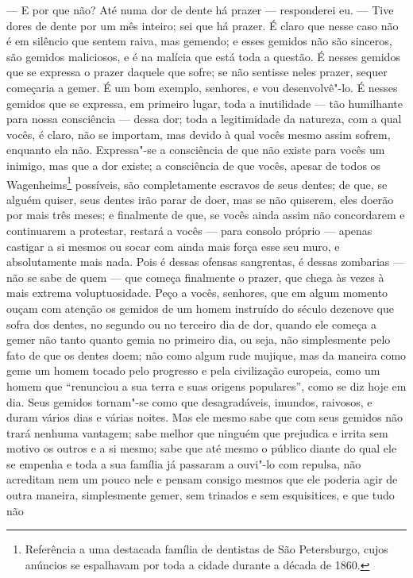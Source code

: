 --- E por que não? Até numa dor de dente há prazer --- responderei eu. ---
Tive dores de dente por um mês inteiro; sei que há prazer. É claro que
nesse caso não é em silêncio que sentem raiva, mas gemendo; e esses
gemidos não são sinceros, são gemidos maliciosos, e é na malícia que
está toda a questão. É nesses gemidos que se expressa o prazer daquele
que sofre; se não sentisse neles prazer, sequer começaria a gemer. É um
bom exemplo, senhores, e vou desenvolvê"-lo. É nesses gemidos que se
expressa, em primeiro lugar, toda a inutilidade --- tão humilhante para
nossa consciência --- dessa dor; toda a legitimidade da natureza, com a
qual vocês, é claro, não se importam, mas devido à qual vocês mesmo
assim sofrem, enquanto ela não. Expressa"-se a consciência de que não
existe para vocês um inimigo, mas que a dor existe; a consciência de
que vocês, apesar de todos os Wagenheims\footnote{ Referência a uma destacada 
família de dentistas de São Petersburgo,
cujos anúncios se espalhavam por toda a cidade durante a década de
1860.} possíveis, são completamente escravos de seus dentes; de que, se alguém
quiser, seus dentes irão parar de doer, mas se não quiserem, eles
doerão por mais três meses; e finalmente de que, se vocês ainda assim
não concordarem e continuarem a protestar, restará a vocês --- para
consolo próprio --- apenas castigar a si mesmos ou socar com ainda mais
força esse seu muro, e absolutamente mais nada. Pois é dessas ofensas
sangrentas, é dessas zombarias --- não se sabe de quem --- que começa
finalmente o prazer, que chega às vezes à mais extrema voluptuosidade.
Peço a vocês, senhores, que em algum momento ouçam com atenção os
gemidos de um homem instruído do século  dezenove que sofra dos dentes, no
segundo ou no terceiro dia de dor, quando ele começa a gemer não tanto
quanto gemia no primeiro dia, ou seja, não simplesmente pelo fato de
que os dentes doem; não como algum rude mujique, mas da maneira como
geme um homem tocado pelo progresso e pela civilização europeia, como
um homem que “renunciou a sua terra e suas origens populares”, como se
diz hoje em dia. Seus gemidos tornam"-se como que desagradáveis,
imundos, raivosos, e duram vários dias e várias noites. Mas ele mesmo
sabe que com seus gemidos não trará nenhuma vantagem; sabe melhor que
ninguém que prejudica e irrita sem motivo os outros e a si mesmo; sabe
que até mesmo o público diante do qual ele se empenha e toda a sua
família já passaram a ouvi"-lo com repulsa, não acreditam nem um pouco
nele e pensam consigo mesmos que ele poderia agir de outra maneira,
simplesmente gemer, sem trinados e sem esquisitices, e que tudo não

